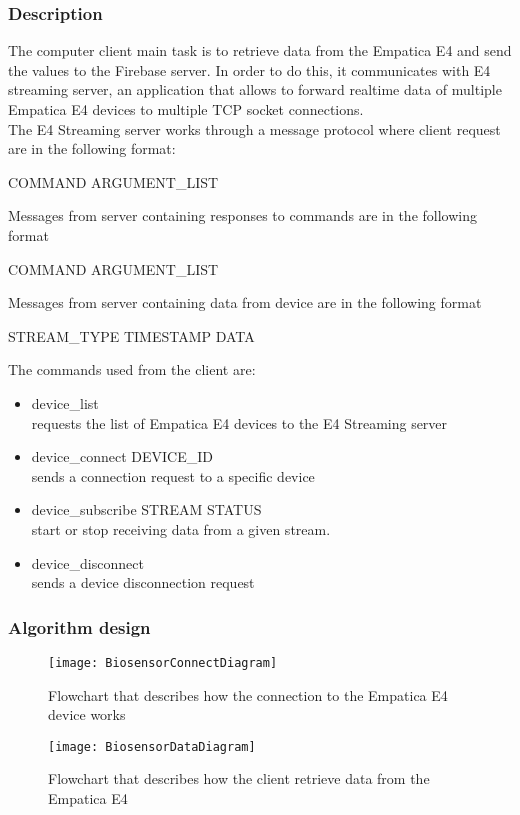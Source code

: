 \subsubsection{Description}
The computer client main task is to retrieve data from the Empatica E4 and send the values to the Firebase server. In order to do this, it communicates with E4 streaming server, an application that allows to forward realtime data of multiple Empatica E4 devices to multiple TCP socket connections.\\
The E4 Streaming server works through a message protocol where client request are in the following format:
\begin{center}
	COMMAND ARGUMENT\_LIST
\end{center}
Messages from server containing responses to commands are in the following format
\begin{center}
	COMMAND ARGUMENT\_LIST
\end{center}
Messages from server containing data from device are in the following format
\begin{center}
	STREAM\_TYPE TIMESTAMP DATA
\end{center}
The commands used from the client are:
\begin{itemize}
	\item device\_list\\
	requests the list of Empatica E4 devices to the E4 Streaming server
	\item device\_connect DEVICE\_ID\\
	sends a connection request to a specific device
	\item device\_subscribe STREAM STATUS\\
	start or stop receiving data from a given stream.
	\item device\_disconnect\\
	sends a device disconnection request
\end{itemize}
\pagebreak
\subsubsection{Algorithm design}
\begin{figure}[H]
	\centering
	\texttt{[image: BiosensorConnectDiagram]}
	\caption{Flowchart that describes how the connection to the Empatica E4 device works}
\end{figure}

\begin{figure}[H]
	\centering
	\texttt{[image: BiosensorDataDiagram]}
	\caption{Flowchart that describes how the client retrieve data from the Empatica E4}
\end{figure}

